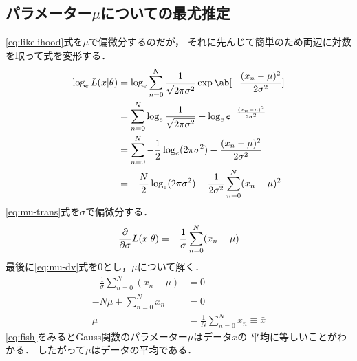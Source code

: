 \documentclass{jlreq}
\begin{document}
		\subsection{パラメーター\(\mu\)についての最尤推定}
			\eqref{eq:likelihood}式を\(\mu\)で偏微分するのだが，
			それに先んじて簡単のため両辺に対数を取って式を変形する．
				\begin{align}
					\log_e L(x|\theta) &= \log_e \sum_{n=0}^N 
						\frac{1}{\sqrt{2\pi\sigma^2}}
						\exp\ab[{-\frac{(x_n-\mu)^2}{2\sigma^2}}]\\
					&= \sum_{n=0}^N\log_e\frac{1}{\sqrt{2\pi\sigma^2}} +
						\log_e e^{-\frac{(x_n-\mu)^2}{2\sigma^2}}\\
					&= \sum_{n=0}^N -\frac{1}{2}\log_e(2\pi\sigma^2) -
					\frac{(x_n-\mu)^2}{2\sigma^2}\\
					&= -\frac{N}{2}\log_e(2\pi\sigma^2) -
						\frac{1}{2\sigma^2}\sum_{n=0}^N(x_n-\mu)^2\label{eq:mu-trans}
				\end{align}
			\eqref{eq:mu-trans}式を\(\sigma\)で偏微分する．
				\begin{equation}
					\pdv{}{\sigma}L(x|\theta) =
						-\frac{1}{\sigma}\sum_{n=0}^N(x_n-\mu)\label{eq:mu-dv}
				\end{equation}
			最後に\eqref{eq:mu-dv}式を0とし，\(\mu\)について解く．
				\begin{align}
					-\frac{1}{\sigma}\sum_{n=0}^N(x_n-\mu) &= 0\\
					-N\mu + \sum_{n=0}^Nx_n &= 0\\
					\mu &= \frac{1}{N}\sum_{n=0}^Nx_n \equiv \bar{x} \label{eq:fish}
				\end{align}
			\eqref{eq:fish}をみるとGauss関数のパラメーター\(\mu\)はデータ\(x\)の
			平均に等しいことがわかる．
			したがって\(\mu\)はデータの平均である．
\end{document}
